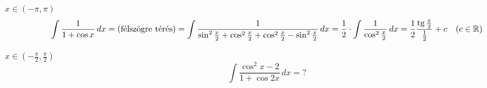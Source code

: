 \documentclass[a4paper,11.5pt]{article}
\DeclareMathOperator{\tg}{tg}
\begin{document}
	\begin{task} $x\in(-\pi,\pi)$
		\[\int\frac{1}{1+\cos x}\,dx=\text{(félszögre térés)}=\int\frac{1}{\sin^2\frac{x}{2}+\cos^2\frac{x}{2}+\cos^2\frac{x}{2}-\sin^2\frac{x}{2}}\,dx=\frac{1}{2}\cdot\int\frac{1}{\cos^2\frac{x}{2}}\,dx=\frac{1}{2}\frac{\tg \frac{x}{2}}{\frac{1}{2}}+c\quad (c\in\R) \]
	\end{task}
	\begin{exercise}$x\in\left(-\frac{\pi}{2},\frac{\pi}{2}\right)$
		\[ \int\frac{\cos^2x-2}{1+\cos2x}\,dx=? \]
	\end{exercise}
\end{document}
